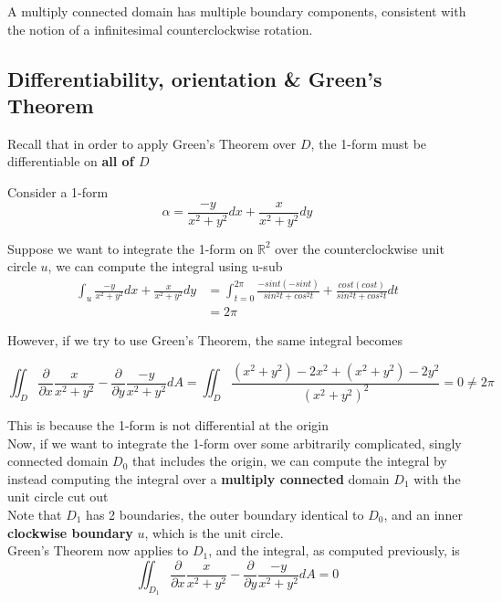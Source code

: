 A multiply connected domain has multiple boundary components, consistent with the notion of a infinitesimal counterclockwise rotation.

\subsection{Differentiability, orientation \& Green's Theorem}

Recall that in order to apply Green's Theorem over $D$, the 1-form must be differentiable on \textbf{all of $D$}

Consider a 1-form
\[
  \alpha = \frac{-y}{x^2 + y^2} dx + \frac{x}{x^2 + y^2}dy
\] 

Suppose we want to integrate the 1-form on $\mathbb{R}^2$ over the counterclockwise unit circle $u$, we can compute the integral using u-sub
\begin{align*}
   \int_{u}^{}  \frac{-y}{x^2 + y^2} dx + \frac{x}{x^2 + y^2}dy &= 
   \int_{t = 0 }^{2\pi}  \frac{-sint (-sint)}{sin^2 t + cos^2 t} + \frac{cost (cost)}{sin^2 t + cos^2 t} dt \\
                                                                &= 2\pi
\end{align*}

However, if we try to use Green's Theorem, the same integral becomes

\[
   \iint_{D} \frac{\partial }{\partial x} \frac{x}{x^2 + y^2} - \frac{\partial }{\partial y} \frac{-y}{x^2 + y^2} dA = \iint_{D} \frac{(x^2 + y^2) - 2x^2 + (x^2 + y^2) - 2y^2}{(x^2+ y^2)^2 } = 0 \neq 2\pi
\] 

This is because the 1-form is not differential at the origin \\

Now, if we want to integrate the 1-form over some arbitrarily complicated, singly connected domain $D_0$ that includes the origin, we can compute the integral by instead computing the integral over a \textbf{multiply connected} domain $D_1$ with the unit circle cut out \\

Note that $D_1$ has 2 boundaries, the outer boundary identical to $D_0$, and an inner \textbf{clockwise boundary}  $u$, which is the unit circle. \\

Green's Theorem now applies to $D_1$, and the integral, as computed previously, is
\[
   \iint_{D_1} \frac{\partial }{\partial x} \frac{x}{ x^2 + y^2} - \frac{\partial }{\partial y} \frac{-y}{ x^2  + y^2} dA = 0
\] 

